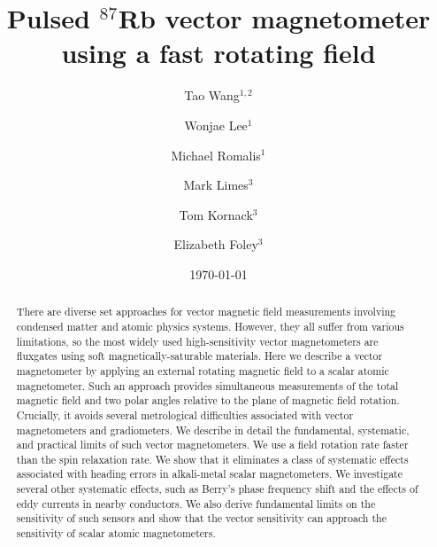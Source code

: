\documentclass[prx,twocolumn,10pt,nofootinbib]{revtex4-1}
\begin{document}
\title{Pulsed $^{87}$Rb vector magnetometer using a fast rotating field}
\author{Tao Wang$^{1, 2}$}
\author{Wonjae Lee$^1$}
\author{Michael Romalis$^1$}
\author{Mark Limes$^3$}
\author{Tom Kornack$^3$}
\author{Elizabeth Foley$^3$}

\date{\today}

\begin{abstract}
There are diverse set approaches for vector magnetic ﬁeld measurements involving condensed matter and atomic physics systems. However, they all suﬀer from various limitations, so the most widely used high-sensitivity vector magnetometers are ﬂuxgates using soft magnetically-saturable materials. Here we describe a vector magnetometer by applying an external rotating magnetic ﬁeld to a scalar atomic magnetometer. Such an approach provides simultaneous measurements of the total magnetic ﬁeld and two polar angles relative to the plane of magnetic ﬁeld rotation. Crucially, it avoids several metrological diﬃculties associated with vector magnetometers and gradiometers. We describe in detail the fundamental, systematic, and practical limits of such vector magnetometers. We use a ﬁeld rotation rate faster than the spin relaxation rate. We show that it eliminates a class of systematic eﬀects associated with heading errors in alkali-metal scalar magnetometers. We investigate several other systematic eﬀects, such as Berry’s phase frequency shift and the eﬀects of eddy currents in nearby conductors. We also derive fundamental limits on the sensitivity of such sensors and show that the vector sensitivity can approach the sensitivity of scalar atomic magnetometers.
\end{abstract}
\maketitle
\end{document}
